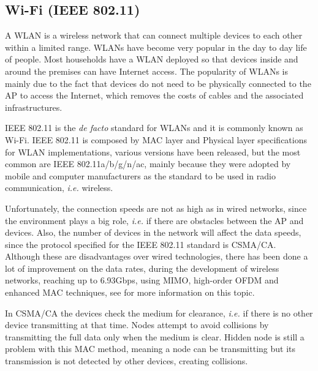 
\subsection{Wi-Fi (IEEE 802.11)}
\label{subsection:wifi}

A \gls{WLAN} is a wireless network that can connect multiple devices to each other within a limited range. \glspl{WLAN} have become very popular in the day to day life of people. Most households have a \gls{WLAN} deployed so that devices inside and around the premises can have Internet access. The popularity of \glspl{WLAN} is mainly due to the fact that devices do not need to be physically connected to the \gls{AP} to access the Internet, which removes the costs of cables and the associated infrastructures.

IEEE 802.11 is the \textit{de facto} standard for \glspl{WLAN} and it is commonly known as Wi-Fi. IEEE 802.11 is composed by \gls{MAC} layer and Physical layer specifications for \gls{WLAN} implementations, various versions have been released, but the most common are IEEE 802.11a/b/g/n/ac, mainly because they were adopted by mobile and computer manufacturers as the standard to be used in radio communication, \textit{i.e.} wireless.

Unfortunately, the connection speeds are not as high as in wired networks, since the environment plays a big role, \textit{i.e.} if there are obstacles between the \gls{AP} and devices. Also, the number of devices in the network will affect the data speeds, since the protocol specified for the IEEE 802.11 standard is \gls{CSMA/CA}. Although these are disadvantages over wired technologies, there has been done a lot of improvement on the data rates, during the development of wireless networks, reaching up to 6.93Gbps, using \gls{MIMO}, high-order \gls{OFDM} and enhanced \gls{MAC} techniques, see \cite{IEEE80211} for more information on this topic.

In \gls{CSMA/CA} the devices check the medium for clearance, \textit{i.e.} if there is no other device transmitting at that time. Nodes attempt to avoid collisions by transmitting the full data only when the medium is clear. Hidden node is still a problem with this \gls{MAC} method, meaning a node can be transmitting but its transmission is not detected by other devices, creating collisions.

